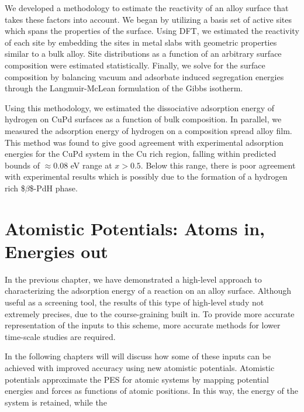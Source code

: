 \documentclass[12pt]{cmuthesis}
\begin{document}
We developed a methodology to estimate the reactivity of an alloy surface that takes these factors into account. We began by utilizing a basis set of active sites which spans the properties of the surface. Using DFT, we estimated the reactivity of each site by embedding the sites in metal slabs with geometric properties similar to a bulk alloy. Site distributions as a function of an arbitrary surface composition were estimated statistically. Finally, we solve for the surface composition by balancing vacuum and adsorbate induced segregation energies through the Langmuir-McLean formulation of the Gibbs isotherm.

Using this methodology, we estimated the dissociative adsorption energy of hydrogen on CuPd surfaces as a function of bulk composition. In parallel, we measured the adsorption energy of hydrogen on a composition spread alloy film.  This method was found to give good agreement with experimental adsorption energies for the CuPd system in the Cu rich region, falling within predicted bounds of \(\approx 0.08\) eV range at \(x > 0.5\). Below this range, there is poor agreement with experimental results which is possibly due to the formation of a hydrogen rich \$\(\beta\)\$-PdH phase.

\chapter{Atomistic Potentials: Atoms in, Energies out}
\label{sec:ch3}
In the previous chapter, we have demonstrated a high-level approach to characterizing the adsorption energy of a reaction on an alloy surface. Although useful as a screening tool, the results of this type of high-level study not extremely precises, due to the course-graining built in. To provide more accurate representation of the inputs to this scheme, more accurate methods for lower time-scale studies are required.

In the following chapters will will discuss how some of these inputs can be achieved with improved accuracy using new atomistic potentials. Atomistic potentials approximate the PES for atomic systems by mapping potential energies and forces as functions of atomic positions. In this way, the energy of the system is retained, while the
\end{document}

